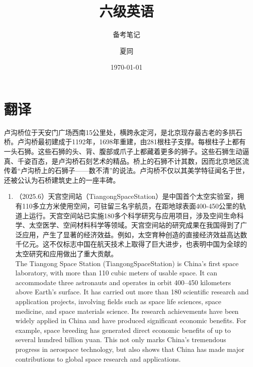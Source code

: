 ﻿\documentclass[lang=cn,11pt]{elegantbook}
\title{六级英语}
\subtitle{备考笔记}
\author{夏同}
\institute{华南理工大学}
\date{\today}
\begin{document}
\maketitle
\frontmatter
\tableofcontents
\mainmatter
\chapter{翻译}

卢沟桥位于天安门广场西南15公里处，横跨永定河，是北京现存最古老的多拱石桥。卢沟桥最初建成于1192年，1698年重建，由281根柱子支撑。每根柱子上都有一头石狮。这些石狮的头、背、腹部或爪子上都藏着更多的狮子。这些石狮生动逼真、千姿百态，是卢沟桥石刻艺术的精品。桥上的石狮不计其数，因而北京地区流传着“卢沟桥上的石狮子——数不清”的说法。卢沟桥不仅以其美学特征闻名于世，还被公认为石桥建筑史上的一座丰碑。
\begin{enumerate}
    \item （2025.6）天宫空间站（TiangongSpaceStation）是中国首个太空实验室，拥有110多立方米使用空间，可驻留三名宇航员，在距地球表面400-450公里的轨道上运行。天宫空间站已实施180多个科学研究与应用项目，涉及空间生命科学、太空医学、空间材料科学等领域。天宫空间站的研究成果在我国得到了广泛应用，产生了显著的经济效益。例如，太空育种创造的直接经济效益高达数千亿元。这不仅标志中国在航天技术上取得了巨大进步，也表明中国为全球的太空研究和应用做出了重大贡献。\\The Tiangong Space Station (TiangongSpaceStation) is China’s first space laboratory, with more than 110 cubic meters of usable space. It can accommodate three astronauts and operates in orbit 400–450 kilometers above Earth’s surface. It has carried out more than 180 scientific research and application projects, involving fields such as space life sciences, space medicine, and space materials science. Its research achievements have been widely applied in China and have produced significant economic benefits. For example, space breeding has generated direct economic benefits of up to several hundred billion yuan. This not only marks China’s tremendous progress in aerospace technology, but also shows that China has made major contributions to global space research and applications.

\end{enumerate}
\end{document}
